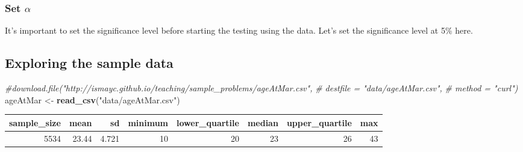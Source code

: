 \documentclass[]{tufte-book}
\newenvironment{Shaded}{\begin{snugshade}}{\end{snugshade}}
\newcommand{\KeywordTok}[1]{\textcolor[rgb]{0.13,0.29,0.53}{\textbf{{#1}}}}
\newcommand{\DataTypeTok}[1]{\textcolor[rgb]{0.13,0.29,0.53}{{#1}}}
\newcommand{\FloatTok}[1]{\textcolor[rgb]{0.00,0.00,0.81}{{#1}}}
\newcommand{\StringTok}[1]{\textcolor[rgb]{0.31,0.60,0.02}{{#1}}}
\newcommand{\CommentTok}[1]{\textcolor[rgb]{0.56,0.35,0.01}{\textit{{#1}}}}
\newcommand{\NormalTok}[1]{{#1}}
\theoremstyle{definition}
\theoremstyle{definition}
\theoremstyle{remark}
\begin{document}
\subsubsection{\texorpdfstring{Set
\(\alpha\)}{Set \textbackslash{}alpha}}\label{set-alpha}

It's important to set the significance level before starting the testing
using the data. Let's set the significance level at 5\% here.

\subsection{Exploring the sample data}\label{exploring-the-sample-data}

\begin{Shaded}
\begin{Highlighting}[]
\CommentTok{#download.file("http://ismayc.github.io/teaching/sample_problems/ageAtMar.csv", }
\CommentTok{#  destfile = "data/ageAtMar.csv",}
\CommentTok{#  method = "curl")}
\NormalTok{ageAtMar <-}\StringTok{ }\KeywordTok{read_csv}\NormalTok{(}\StringTok{"data/ageAtMar.csv"}\NormalTok{)}
\end{Highlighting}
\end{Shaded}

\begin{Shaded}
\end{Shaded}

\begin{tabular}{r|r|r|r|r|r|r|r}
\hline
sample\_size & mean & sd & minimum & lower\_quartile & median & upper\_quartile & max\\
\hline
5534 & 23.44 & 4.721 & 10 & 20 & 23 & 26 & 43\\
\hline
\end{tabular}
\end{document}
